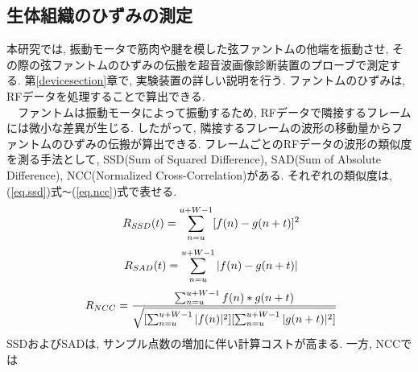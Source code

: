 \subsection{生体組織のひずみの測定}
本研究では, 振動モータで筋肉や腱を模した弦ファントムの他端を振動させ, その際の弦ファントムのひずみの伝搬を超音波画像診断装置のプローブで測定する. 第\ref{devicesection}章で, 実験装置の詳しい説明を行う. ファントムのひずみは, RFデータを処理することで算出できる. 
\\\ \ ファントムは振動モータによって振動するため, RFデータで隣接するフレームには微小な差異が生じる. したがって, 隣接するフレームの波形の移動量からファントムのひずみの伝搬が算出できる. フレームごとのRFデータの波形の類似度を測る手法として, SSD(Sum of Squared Difference), SAD(Sum of Absolute Difference), NCC(Normalized Cross-Correlation)がある. それぞれの類似度は, (\ref{eq.ssd})式\verb|〜|(\ref{eq.ncc})式で表せる\cite{yoshimurasan}. 
\begin{equation}
\label{eq.ssd}
\\\ R_{SSD} (t) =\sum_{n=u}^{u+W-1} [f(n) - g(n + t)]^2
\end{equation}
\begin{equation}
\label{eq.sad}
\\\  R_{SAD} (t) =\sum_{n=u}^{u+W-1} |f(n) - g(n + t)|
\end{equation}
\begin{equation}
\label{eq.ncc}
\\\ R_{NCC} = \dfrac{\sum_{n=u}^{u+W-1} f(n) * g(n + t)}{\sqrt{[\sum_{n=u}^{u+W-1}|f(n)|^2][\sum_{n=u}^{u+W-1}|g(n+t)|^2]}}
\end{equation}
SSDおよびSADは, サンプル点数の増加に伴い計算コストが高まる. 一方, NCCでは
